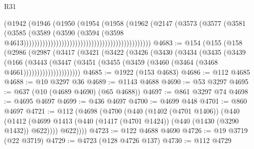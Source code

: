 \begin{lexlean}{R31}
\begin{coremodule}
                                                                    (@1942
                                                                      (@1946
                                                                        (@1950
                                                                          (@1954
                                                                            (@1958
                                                                              (@1962
                                                                                (@2147
                                                                                  (@3573
                                                                                    (@3577
                                                                                      (@3581
                                                                                        (@3585
                                                                                          (@3589
                                                                                            (@3590
                                                                                              (@3594
                                                                                                (@3598
                                                                                                  @4613)))))))))))))))))))))))))))))))))))))))))))))))
@4683 := @154
    (@155
      (@158
        (@2986
          (@2987
            (@3417
              (@3421
                (@3422
                  (@3426
                    (@3430
                      (@3434
                        (@3435
                          (@3439
                            (@166
                              (@3443
                                (@3447
                                  (@3451
                                    (@3455 (@3459 (@3460 (@3464 (@3468 @4661)))))))))))))))))))))
@4685 := @1922 (@153 @4683)
@4686 := @112 @4685
@4688 := @10 @3297 @36
@4689 := @1143 @4688
@4690 := @53 @3297
@4695 := @637 (@10 (@4689 @4690) (@65 @4688))
@4697 := @861 @3297 @74
@4698 := @4695 @4697
@4699 := @436 @4697
@4700 := @4699 @448
@4701 := @860 @4697
@4721 := @112
    (@4698
      (@4700
        (@440
          (@1402 (@4701 @1406))
          (@440
            (@1412 (@4699 @1413 (@440 (@1417 (@4701 @1424)) (@440 (@1430 (@3290 @1432)) @622))))
            @622))))
@4723 := @122 @4688 @4690
@4726 := @19 @3719 (@22 @3719)
@4729 := @4723 (@128 @4726 @137)
@4730 := @112 @4729

\end{coremodule}
\end{lexlean}
